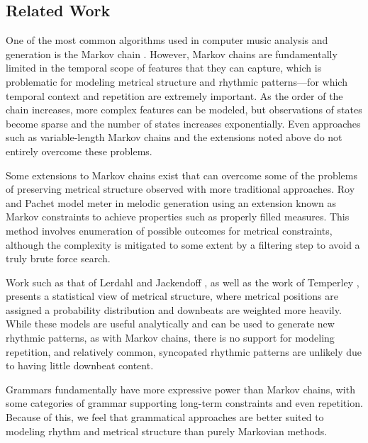 \documentclass{article}
\begin{document}
\subsection{Related Work}

One of the most common algorithms used in computer music analysis and generation is the Markov chain \cite{chordia2011, gillick2009, yi, pachet}. However, Markov chains are fundamentally limited in the temporal scope of features that they can capture, which is problematic for modeling metrical structure and rhythmic patterns---for which temporal context and repetition are extremely important. As the order of the chain increases, more complex features can be modeled, but observations of states become sparse and the number of states increases exponentially. Even approaches such as variable-length Markov chains \cite{ron, buhlmann} and the extensions noted above do not entirely overcome these problems.

Some extensions to Markov chains exist that can overcome some of the problems of preserving metrical structure observed with more traditional approaches. Roy and Pachet model meter in melodic generation \cite{roy2013} using an extension known as Markov constraints \cite{pachet2011} to achieve properties such as properly filled measures. This method involves enumeration of possible outcomes for metrical constraints, although the complexity is mitigated to some extent by a filtering step to avoid a truly brute force search.

Work such as that of Lerdahl and Jackendoff \cite{gttm}, as well as the work of Temperley \cite{temperley2010}, presents a statistical view of metrical structure, where metrical positions are assigned a probability distribution and downbeats are weighted more heavily. While these models are useful analytically and can be used to generate new rhythmic patterns, as with Markov chains, there is no support for modeling repetition, and relatively common, syncopated rhythmic patterns are unlikely due to having little downbeat content. 

Grammars fundamentally have more expressive power \linebreak than Markov chains, with some categories of grammar supporting long-term constraints and even repetition. Because of this, we feel that grammatical approaches are better \linebreak suited to modeling rhythm and metrical structure than \linebreak purely Markovian methods.
\end{document}
